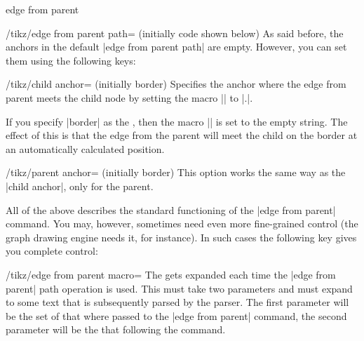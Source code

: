 \begin{pathoperation}{edge from parent}{}
\begin{enumerate}
\begin{key}{/tikz/edge from parent path= (initially \normalfont code shown below)}
                As said before, the anchors in the default
                |edge from parent path| are empty. However, you can set them
                using the following keys:
                \begin{key}{/tikz/child anchor= (initially border)}
                    Specifies the anchor where the edge from parent meets the
                    child node by setting the macro |\tikzchildanchor| to
                    |.|.

                    If you specify |border| as the , then the
                    macro |\tikzchildanchor| is set to the empty string. The
                    effect of this is that the edge from the parent will meet
                    the child on the border at an automatically calculated
                    position.
\begin{codeexample}[]
\end{codeexample}
                \end{key}

                \begin{key}{/tikz/parent anchor= (initially border)}
                    This option works the same way as the |child anchor|, only
                    for the parent.
                \end{key}
            \end{key}
    \end{enumerate}

    All of the above describes the standard functioning of the
    |edge from parent| command. You may, however, sometimes need even more
    fine-grained control (the graph drawing engine needs it, for instance). In
    such cases the following key gives you complete control:
    \begin{key}{/tikz/edge from parent macro=}
        The  gets expanded each time the |edge from parent| path
        operation is used. This  must take two parameters and must
        expand to some text that is subsequently parsed by the parser. The
        first parameter will be the set of  that where passed to
        the |edge from parent| command, the second parameter will be the
         that following the command.


\end{key}
\end{pathoperation}
